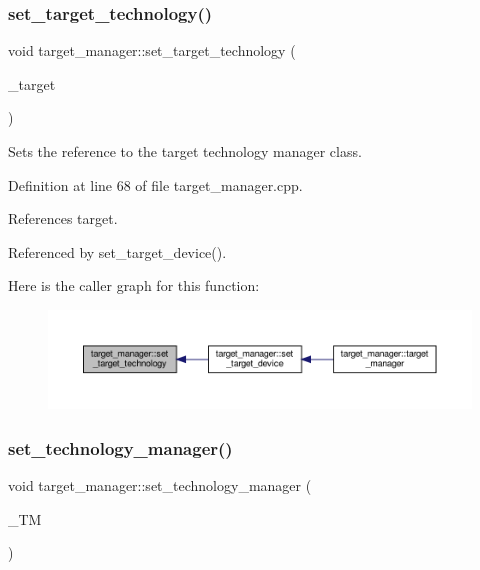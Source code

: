 \subsubsection{\texorpdfstring{set\+\_\+target\+\_\+technology()}{set\_target\_technology()}}
{\footnotesize\ttfamily void target\+\_\+manager\+::set\+\_\+target\+\_\+technology (\begin{DoxyParamCaption}\item[{const \hyperlink{target__technology_8hpp_a16af97aadc4eb998c2c9ec7fba5ccecd}{target\+\_\+technology\+Ref} \&}]{\+\_\+target }\end{DoxyParamCaption})}



Sets the reference to the target technology manager class. 



Definition at line 68 of file target\+\_\+manager.\+cpp.



References target.



Referenced by set\+\_\+target\+\_\+device().

Here is the caller graph for this function\+:
\nopagebreak
\begin{figure}[H]
\begin{center}
\leavevmode
\includegraphics[width=350pt]{da/d43/classtarget__manager_a2efdd4db15ea0230ea28fcad6a5bac53_icgraph}
\end{center}
\end{figure}
\mbox{\label{classtarget__manager_a90e14edbec3c7adda47082b7e13690e2}} 
\subsubsection{\texorpdfstring{set\+\_\+technology\+\_\+manager()}{set\_technology\_manager()}}
{\footnotesize\ttfamily void target\+\_\+manager\+::set\+\_\+technology\+\_\+manager (\begin{DoxyParamCaption}\item[{const \hyperlink{technology__manager_8hpp_a4b9ecd440c804109c962654f9227244e}{technology\+\_\+manager\+Ref} \&}]{\+\_\+\+TM }\end{DoxyParamCaption})}




